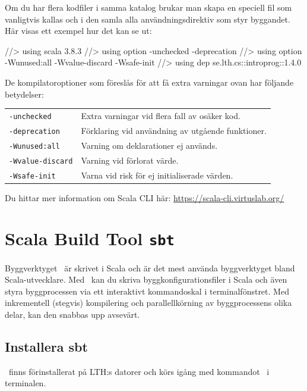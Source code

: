 Om du har flera kodfiler i samma katalog brukar man skapa en speciell fil som vanligtvis kallas  och i den samla alla användningsdirektiv som styr byggandet. Här visas ett exempel hur det kan se ut:
\begin{Code}
//> using scala 3.8.3
//> using option -unchecked -deprecation 
//> using option -Wunused:all -Wvalue-discard -Wsafe-init
//> using dep se.lth.cs::introprog::1.4.0
\end{Code}

\noindent De kompilatoroptioner som föreslås för att få extra varningar ovan har följande betydelser:
\begin{table}[H]
\begin{tabular}{l p{8.5cm}}
\texttt{-unchecked} & Extra varningar vid flera fall av osäker kod. \\
\texttt{-deprecation} & Förklaring vid användning av utgående funktioner. \\
\texttt{-Wunused:all} & Varning om deklarationer ej används. \\
\texttt{-Wvalue-discard} & Varning vid förlorat värde. \\
\texttt{-Wsafe-init} & Varna vid risk för ej initialiserade värden. \\
\end{tabular}
\end{table}

\noindent Du hittar mer information om Scala CLI här: \url{https://scala-cli.virtuslab.org/}



\section{Scala Build Tool \texttt{sbt}}\label{appendix:build:sbt}

Byggverktyget \sbt\ är skrivet i Scala och är det mest använda byggverktyget bland Scala-utvecklare. Med \sbt\ kan du skriva byggkonfigurationsfiler i Scala och även styra byggprocessen via ett interaktivt kommandoskal i terminalfönstret. Med inkrementell (stegvis) kompilering och parallellkörning av byggprocessens olika delar, kan den snabbas upp avsevärt.


\subsection{Installera sbt}

\sbt\ finns förinstallerat på LTH:s datorer och körs igång med kommandot \sbt\ i terminalen.


